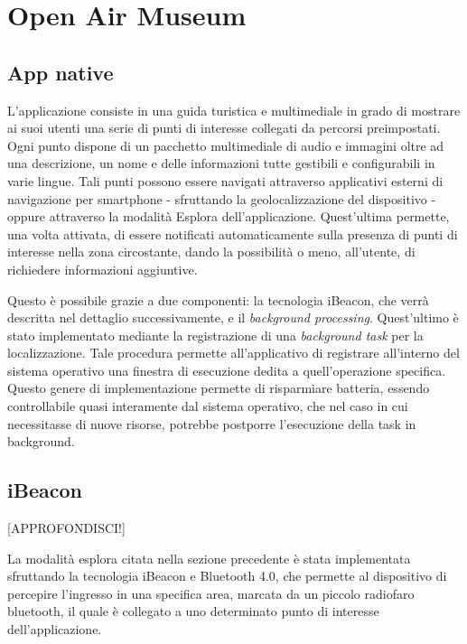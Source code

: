 \chapter{Open Air Museum} %
\label{Open Air Museum}

\vspace{5mm}

\section{App native}\vspace{5mm}

L’applicazione consiste in una guida turistica e multimediale in grado di mostrare ai suoi utenti una serie di punti di interesse collegati da percorsi preimpostati. Ogni punto dispone di un pacchetto multimediale di audio e immagini oltre ad una descrizione, un nome e delle informazioni tutte gestibili e configurabili in varie lingue. Tali punti possono essere navigati attraverso applicativi esterni di navigazione per smartphone - sfruttando la geolocalizzazione del dispositivo - oppure attraverso la modalità Esplora dell’applicazione. Quest'ultima permette, una volta attivata, di essere notificati automaticamente sulla presenza di punti di interesse nella zona circostante, dando la possibilità o meno, all’utente, di richiedere informazioni aggiuntive. \vspace{5mm}

Questo è possibile grazie a due componenti: la tecnologia iBeacon, che verrà descritta nel dettaglio successivamente, e il \emph{background processing}. Quest'ultimo è stato implementato mediante la registrazione di una \emph{background task} per la localizzazione. Tale procedura permette all'applicativo di registrare all'interno del sistema operativo una finestra di esecuzione dedita a quell'operazione specifica. Questo genere di implementazione permette di risparmiare batteria, essendo controllabile quasi interamente dal sistema operativo, che nel caso in cui necessitasse di nuove risorse, potrebbe postporre l'esecuzione della task in background.

\section{iBeacon}\vspace{5mm}

[APPROFONDISCI!]

La modalità esplora citata nella sezione precedente è stata implementata sfruttando la tecnologia iBeacon e Bluetooth 4.0, che permette al dispositivo di percepire l’ingresso in una specifica area, marcata da un piccolo radiofaro bluetooth, il quale è collegato a uno determinato punto di interesse dell'applicazione.\vspace{5mm}

